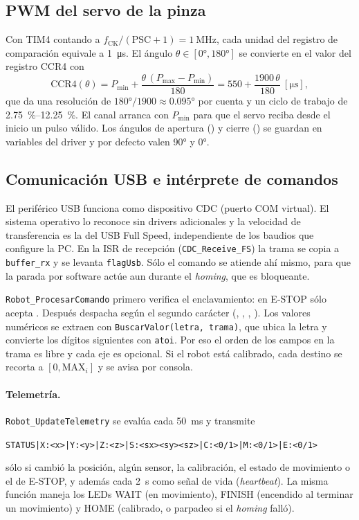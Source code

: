 \subsection{PWM del servo de la pinza}\label{sec:prog-pwm}
Con TIM4 contando a $f_{\mathrm{CK}}/(\mathrm{PSC}+1)=\SI{1}{\mega\hertz}$, cada unidad del
registro de comparación equivale a \SI{1}{\micro\second}. El ángulo $\theta\in[\ang{0},\ang{180}]$
se convierte en el valor del registro CCR4 con
\begin{equation}
  \mathrm{CCR4}(\theta) = P_{\min} + \frac{\theta\,(P_{\max}-P_{\min})}{180}
  = 550 + \frac{1900\,\theta}{180}\ [\si{\micro\second}],
\end{equation}
que da una resolución de $\ang{180}/1900 \approx \ang{0,095}$ por cuenta y un ciclo de trabajo
de \SIrange{2,75}{12,25}{\percent}. El canal arranca con $P_{\min}$ para que el servo reciba
desde el inicio un pulso válido. Los ángulos de apertura () y cierre () se
guardan en variables del driver y por defecto valen \ang{90} y \ang{0}.

\subsection{Comunicación USB e intérprete de comandos}
El periférico USB funciona como dispositivo CDC (puerto COM virtual). El sistema operativo lo
reconoce sin drivers adicionales y la velocidad de transferencia es la del USB Full Speed,
independiente de los baudios que configure la PC. En la ISR de recepción
(\texttt{CDC\_Receive\_FS}) la trama se copia a \texttt{buffer\_rx} y se levanta
\texttt{flagUsb}. Sólo el comando  se atiende ahí mismo, para que la parada por
software actúe aun durante el \emph{homing}, que es bloqueante.

\texttt{Robot\_ProcesarComando} primero verifica el enclavamiento: en E-STOP sólo acepta
. Después despacha según el segundo carácter (\cmd{-}, \cmd{\#}, \cmd{+}, \cmd{*}).
Los valores numéricos se extraen con \texttt{BuscarValor(letra, trama)}, que ubica la letra
y convierte los dígitos siguientes con \texttt{atoi}. Por eso el orden de los campos en la
trama es libre y cada eje es opcional. Si el robot está calibrado, cada destino se recorta a
$[0,\mathrm{MAX}_i]$ y se avisa por consola.

\paragraph{Telemetría.}
\texttt{Robot\_UpdateTelemetry} se evalúa cada \SI{50}{\milli\second} y transmite
\begin{center}
\texttt{STATUS|X:<x>|Y:<y>|Z:<z>|S:<sx><sy><sz>|C:<0/1>|M:<0/1>|E:<0/1>}
\end{center}
sólo si cambió la posición, algún sensor, la calibración, el estado de movimiento o el de
E-STOP, y además cada \SI{2}{\second} como señal de vida (\emph{heartbeat}). La misma función
maneja los LEDs WAIT (en movimiento), FINISH (encendido al terminar un movimiento) y HOME
(calibrado, o parpadeo si el \emph{homing} falló).

